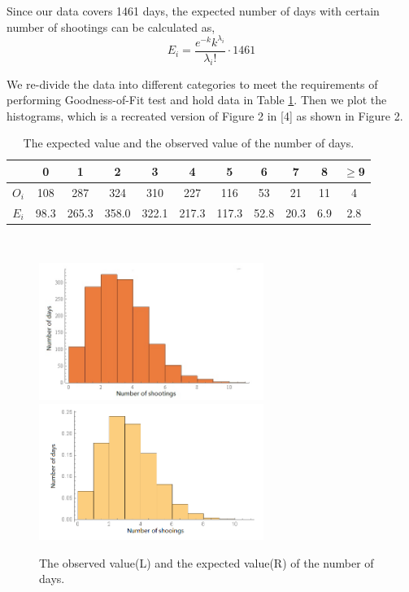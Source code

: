 \documentclass[a4paper]{article}
\begin{document}
{{Since our data covers 1461 days, the expected number of days with certain number of shootings can be calculated as,
\begin{equation}
    E_i = \frac{e^{-k}k^{\lambda_i}}{\lambda_i!}\cdot 1461
\end{equation}
\par{We re-divide the data into different categories to meet the requirements of performing Goodness-of-Fit test and hold data in Table \ref{aaa}. Then we plot the histograms, which is a recreated version of Figure 2 in [4] as shown in Figure 2.}
\begin{table}[h]
\centering
    \begin{tabular}{c|cccccccccc}
    \hline
     & 0 & 1 & 2 & 3 & 4 & 5 & 6 & 7 & 8 & $\geq$9\\
    \hline
    \hline
    $O_i$ & 108 & 287 & 324 & 310 & 227 & 116 &53 &21 & 11 & 4\\
    $E_i$ & 98.3 & 265.3 & 358.0 & 322.1 & 217.3 & 117.3 & 52.8 & 20.3 & 6.9 & 2.8\\
    \hline
    \end{tabular}\\
\caption{The expected value and the observed value of the number of days.}
\label{aaa}
\end{table}
\newpage
\begin{figure}[h]
    \centering
\includegraphics[width = 7.3cm]{figure3-1}
\includegraphics[width = 7.3cm]{figure3-2.png}
     \caption{The observed value(L) and the expected value(R) of the number of days.}
    \label{f1}
\end{figure}

}}
\end{document}

